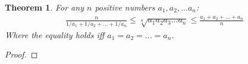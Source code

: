 \documentclass{article}
\newtheorem*{thm}{Theorem}
\begin{document}
\begin{thm}
For any $n$ positive numbers $a_1, a_2, ... a_n$: 
\begin{align*}
\frac{n}{1/a_1 + 1/a_2 + ... + 1/a_n} \leq \sqrt[n]{a_1 a_2 a_3 ... a_n} \leq \frac{a_1 + a_2 + ... + a_n}{n}
\end{align*}
Where the equality holds iff $a_1 = a_2 = ... = a_n$.
\end{thm}

\begin{proof}

\end{proof}
\end{document}
